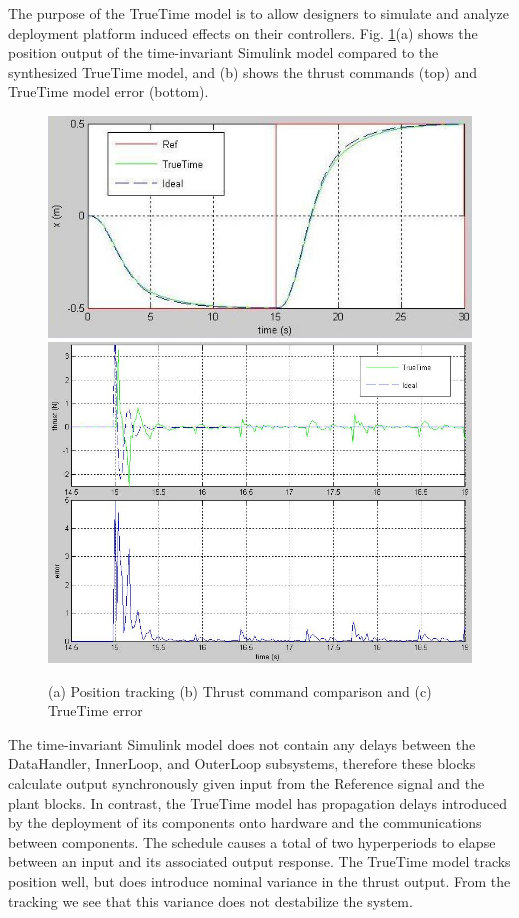 The purpose of the TrueTime model is to allow designers to simulate and analyze deployment platform induced effects on their controllers.  Fig. \ref{fig:quadintegrator_results}(a) shows the position output of the time-invariant Simulink model compared to the synthesized TrueTime model, and (b) shows the thrust commands (top) and TrueTime model error (bottom).
\begin{figure}[t]
\centering
\includegraphics[width=\columnwidth]{figures/results.jpg}
\includegraphics[width=\columnwidth]{figures/results2.jpg}
    \caption{(a) Position tracking (b) Thrust command comparison and (c) TrueTime error}
    \label{fig:quadintegrator_results}
\end{figure}
The time-invariant Simulink model does not contain any delays between the DataHandler, InnerLoop, and OuterLoop subsystems, therefore these blocks calculate output synchronously given input from the Reference signal and the plant blocks.  In contrast, the TrueTime model has propagation delays introduced by the deployment of its components onto hardware and the communications between components.  The schedule causes a total of two hyperperiods to elapse between an input and its associated output response.  The TrueTime model tracks position well, but does introduce nominal variance in the thrust output.  From the tracking we see that this variance does not destabilize the system.
